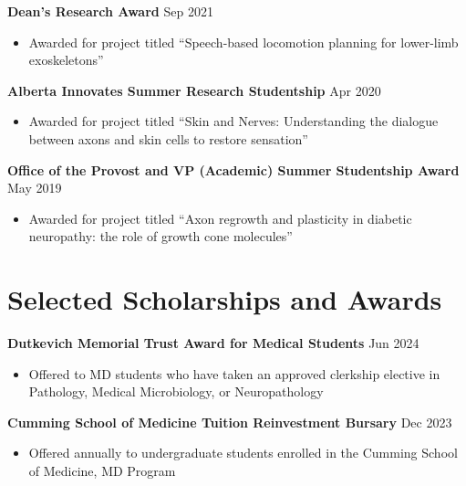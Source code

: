 \documentclass{article}
\begin{document}
\textbf{Dean's Research Award} \hfill Sep 2021
\begin{itemize}
    \item Awarded for project titled ``Speech-based locomotion planning for lower-limb exoskeletons''
\end{itemize} \vspace{1em}

\textbf{Alberta Innovates Summer Research Studentship} \hfill Apr 2020
\begin{itemize}
    \item Awarded for project titled ``Skin and Nerves: Understanding the dialogue between axons and skin cells to restore sensation''
\end{itemize} \vspace{1em}

\textbf{Office of the Provost and VP (Academic) Summer Studentship Award} \hfill May 2019
\begin{itemize}
    \item Awarded for project titled ``Axon regrowth and plasticity in diabetic neuropathy: the role of growth cone molecules''
\end{itemize}


\section*{\textcolor{my_colour}{Selected Scholarships and Awards} }
\vspace{-.25em} \hrulefill \vspace{.25em}

\textbf{Dutkevich Memorial Trust Award for Medical Students} \hfill Jun 2024
\begin{itemize}
    \item Offered to MD students who have taken an  approved clerkship elective in Pathology, Medical Microbiology, or Neuropathology
\end{itemize} \vspace{1em}

\textbf{Cumming School of Medicine Tuition Reinvestment Bursary} \hfill Dec 2023
\begin{itemize}
    \item Offered annually to undergraduate students enrolled in the Cumming School of Medicine, MD Program
\end{itemize} \vspace{1em}
\end{document}
